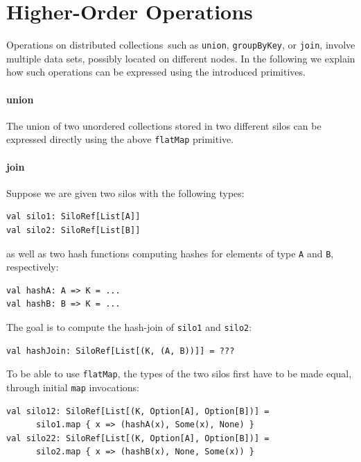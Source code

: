 \documentclass[preprint]{sigplanconf}
\theoremstyle{definition}
\theoremstyle{definition}
\begin{document}
\section{Higher-Order Operations}
\label{sec:higher-order-operations}

Operations on distributed collections~such as \verb|union|, \verb|groupByKey|, or
\verb|join|, involve multiple data sets, possibly located on different nodes.
In the following we explain how such operations can be expressed using the
introduced primitives.

\paragraph{union}
The union of two unordered collections stored in two different silos can be
expressed directly using the above \verb|flatMap| primitive.

\paragraph{join}
Suppose we are given two silos with the following types:

\begin{lstlisting}
val silo1: SiloRef[List[A]]
val silo2: SiloRef[List[B]]
\end{lstlisting}

\noindent as well as two hash functions computing hashes for elements of
type \verb|A| and \verb|B|, respectively:

\begin{lstlisting}
val hashA: A => K = ...
val hashB: B => K = ...
\end{lstlisting}

The goal is to compute the hash-join of \verb|silo1| and \verb|silo2|:

\begin{lstlisting}
val hashJoin: SiloRef[List[(K, (A, B))]] = ???
\end{lstlisting}

To be able to use \verb|flatMap|, the types of the two silos first have to be
made equal, through initial \verb|map| invocations:


\begin{lstlisting}
val silo12: SiloRef[List[(K, Option[A], Option[B])] =
      silo1.map { x => (hashA(x), Some(x), None) }
val silo22: SiloRef[List[(K, Option[A], Option[B])] =
      silo2.map { x => (hashB(x), None, Some(x)) }
\end{lstlisting}
\end{document}
